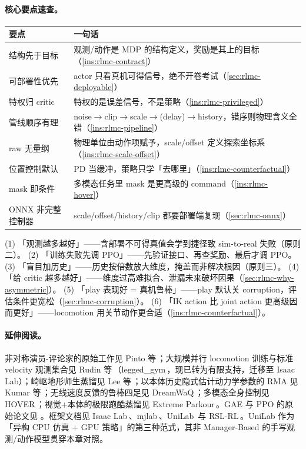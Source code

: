 \paragraph{核心要点速查。}
\begin{center}
\small
\begin{tabular}{@{}ll@{}}
\toprule
要点 & 一句话 \\
\midrule
结构先于目标 & 观测/动作是 MDP 的结构定义，奖励是其上的目标（\cref{ins:rlmc-contract}） \\
可部署性优先 & actor 只看真机可得信号，绝不开卷考试（\cref{sec:rlmc-deployable}） \\
特权归 critic & 特权的是误差信号，不是策略（\cref{ins:rlmc-privileged}） \\
管线顺序有理 & noise$\to$clip$\to$scale$\to$(delay)$\to$history，错序则物理含义全错（\cref{ins:rlmc-pipeline}） \\
raw 无量纲 & 物理单位由动作项赋予，scale/offset 定义探索坐标系（\cref{ins:rlmc-scale-offset}） \\
位置控制默认 & PD 当缓冲，策略只学「去哪里」（\cref{ins:rlmc-counterfactual}） \\
mask 即条件 & 多模态任务里 mask 是更高级的 command（\cref{ins:rlmc-hover}） \\
ONNX 非完整控制器 & scale/offset/history/clip 都要部署端复现（\cref{sec:rlmc-onnx}） \\
\bottomrule
\end{tabular}
\end{center}

\begin{pitfall}[常见误解汇总]
(1) 「观测越多越好」——含部署不可得真值会学到捷径致 sim-to-real 失败（原则二）。
(2) 「训练失败先调 PPO」——先验证接口、再查奖励、最后才调 PPO。
(3) 「盲目加历史」——历史按倍数放大维度，掩盖而非解决根因（原则三）。
(4) 「给 critic 越多越好」——维度过高难拟合、泄漏未来破坏因果（\cref{sec:rlmc-why-asymmetric}）。
(5) 「play 表现好 = 真机鲁棒」——play 默认关 corruption，评估条件更宽松（\cref{sec:rlmc-corruption}）。
(6) 「IK action 比 joint action 更高级因而更好」——locomotion 用关节动作更合适（\cref{ins:rlmc-counterfactual}）。
\end{pitfall}

\paragraph{延伸阅读。}非对称演员-评论家的原始工作见 Pinto 等\,\cite{pinto2018asymmetric}；大规模并行 locomotion 训练与标准 velocity 观测集合见 Rudin 等\,\cite{rudin2021minutes}（legged\_gym\,\cite{leggedrobotics2021}，现已转为有限支持，迁移至 Isaac Lab）；崎岖地形师生蒸馏见 Lee 等\,\cite{lee2020quadruped}；以本体历史隐式估计动力学参数的 RMA 见 Kumar 等\,\cite{kumar2021rma}；无线速度反馈的鲁棒四足见 DreamWaQ\,\cite{nahrendra2023dreamwaq}；多模态全身控制见 HOVER\,\cite{he2025hover}；视觉+本体的极限跑酷蒸馏见 Extreme Parkour\,\cite{cheng2024parkour}。GAE 与 PPO 的原始论文见 \cite{schulman2016gae,schulman2017ppo}。框架文档见 Isaac Lab\,\cite{isaaclab2024}、mjlab\,\cite{mjlab2026}、UniLab\,\cite{unilab2026} 与 RSL-RL\,\cite{schwarke2025rslrl}。UniLab 作为「异构 CPU 仿真 $+$ GPU 策略」的第三种范式，其非 Manager-Based 的手写观测/动作模型贯穿本章对照。

